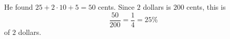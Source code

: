 He found $25+2\cdot10+5=50$ cents. Since $2$ dollars is $200$ cents, this is
\[\dfrac{50}{200}=\dfrac{1}{4}=\boxed{25\%}\]
of $2$ dollars.

